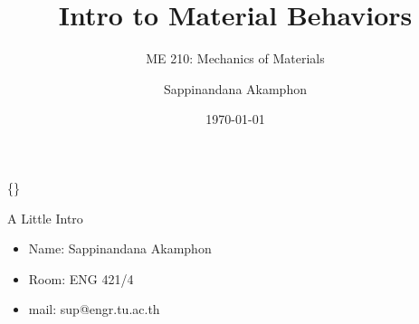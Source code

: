 \documentclass[10pt, svgnames]{beamer}
\author{Sappinandana Akamphon}
\date{\today}
\title{Intro to Material Behaviors}
\subtitle{ME 210: Mechanics of Materials}
\institute{Department of Mechanical Engineering, TSE}
\date{}
\begin{document}
\begin{frame}[label={sec:orga2b4129}]{\{\}}
\maketitle
\end{frame}

\begin{frame}[label={sec:org05878f0}]{A Little Intro}
\begin{itemize}
\item Name: Sappinandana Akamphon

\item Room: ENG 421/4

\item mail: sup@engr.tu.ac.th
\end{itemize}
\end{frame}
\end{document}
